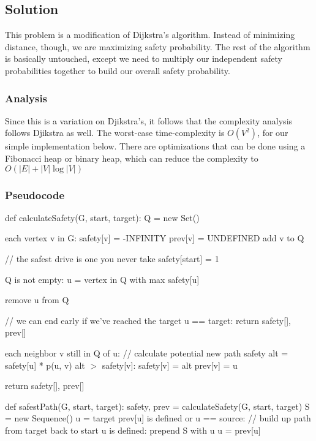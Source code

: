 \subsection*{Solution}

This problem is a modification of Dijkstra's algorithm. Instead of minimizing distance, though, we are maximizing safety probability. The rest of the algorithm is basically untouched, except we need to multiply our independent safety probabilities together to build our overall safety probability.

\subsubsection*{Analysis}

Since this is a variation on Djikstra's, it follows that the complexity analysis follows Djikstra as well. The worst-case time-complexity is $O(V^2)$, for our simple implementation below. There are optimizations that can be done using a Fibonacci heap or binary heap, which can reduce the complexity to $O(|E| + |V| \log |V|)$

\subsubsection*{Pseudocode}
\begin{codebox}
\li def calculateSafety(G, start, target):
\Then
  \li  Q = new Set()

  \li
  \li \For each vertex v in G:
  \Then
    \li  safety[v] = -INFINITY
    \li  prev[v] = UNDEFINED
    \li  add v to Q
  \End

  \li
  \li // the safest drive is one you never take
  \li safety[start] = 1 
  
  \li
  \li \While Q is not empty:
  \Then
    \li u = vertex in Q with max safety[u]

    \li remove u from Q

    \li // we can end early if we've reached the target
    \li \If u == target:
    \Then
      \li return safety[], prev[]
    \End

    \li \For each neighbor v still in Q of u:
    \Then
      \li // calculate potential new path safety 
      \li alt = safety[u] * p(u, v)
      \li \If alt $>$ safety[v]:
      \Then
        \li safety[v] = alt
        \li prev[v] = u
      \End
    \End  
  \End

  \li return safety[], prev[]
\End
\li 

\li def safestPath(G, start, target):
\Then
  \li safety, prev = calculateSafety(G, start, target)
  \li 
  \li S = new Sequence()
  \li u = target
  \li \If prev[u] is defined or u == source:
  \Then
    \li // build up path from target back to start
    \li \While u is defined:
    \Then
      \li prepend S with u
      \li u = prev[u]
    \End
  \End

\end{codebox}

\pagebreak
